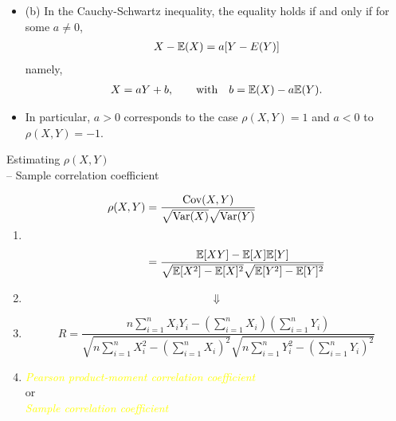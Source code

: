 \begin{frame}[fragile]
\begin{itemize}
	\item[] (b) In the Cauchy-Schwartz inequality, the equality holds if and only if for some $a\ne 0$,
		\begin{align*}
			X-\mathbb{E}(X) = a [Y - E(Y)]
		\end{align*}
		namely,
		\begin{align*}
			X = a Y + b,\qquad \text{with}\quad b= \mathbb{E}(X) -a \mathbb{E}(Y).
		\end{align*}
	\item[] In particular, $a>0$ corresponds to the case $\rho(X,Y)=1$ and $a<0$ to $\rho(X,Y)=-1$.
		\myEnd
\end{itemize}
\end{frame}
\begin{frame}{Estimating $\rho(X,Y)$\\
	-- Sample correlation coefficient}

	\begin{enumerate}
		\item[]
	\begin{align*}
		\rho(X,Y) &=  \frac{\text{Cov}(X,Y)}{\sqrt{\text{Var}(X)}\sqrt{\text{Var}(Y)}}\\[2em]
& =  \frac{\mathbb{E}[X Y] -\mathbb{E}[X]\mathbb{E}[Y]}{\sqrt{\mathbb{E}[X^2]-\mathbb{E}[X]^2}\sqrt{\mathbb{E}[Y^2]-\mathbb{E}[Y]^2}}
	\end{align*}
	\vfill
\item[] \[\Downarrow\]
	\vfill
\item[]
	\[
		R =  \frac{n\sum_{i=1}^n X_iY_i -\left(\sum_{i=1}^n X_i \right )\left(\sum_{i=1}^n Y_i \right ) }{\sqrt{n\sum_{i=1}^n X_i^2- \left(\sum_{i=1}^n X_i \right )^2}\sqrt{n\sum_{i=1}^n Y_i^2- \left(\sum_{i=1}^n Y_i \right )^2}}
	\]
	\vfill
\item[]
	\begin{center}
		{\it \textcolor{yellow}{Pearson product-moment correlation coefficient}}\\[1em]
	or \\[1em]
	{\it \textcolor{yellow}{Sample correlation coefficient}}
	\end{center}
	\end{enumerate}
\end{frame}
